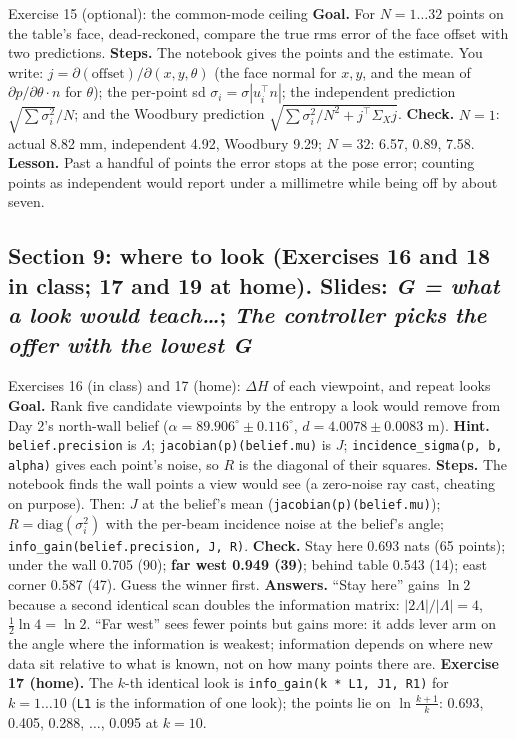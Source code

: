 \documentclass[11pt]{article}
\begin{document}
\begin{labhelp}{Exercise 15 (optional): the common-mode ceiling}
\textbf{Goal.} For $N=1\ldots32$ points on the table's face, dead-reckoned, compare the true rms error of the face offset with two predictions. \textbf{Steps.} The notebook gives the points and the estimate. You write: $j=\partial(\text{offset})/\partial(x,y,\theta)$ (the face normal for $x,y$, and the mean of $\partial p/\partial\theta\cdot n$ for $\theta$); the per-point sd $\sigma_i=\sigma|u_i^\top n|$; the independent prediction $\sqrt{\sum\sigma_i^2}/N$; and the Woodbury prediction $\sqrt{\sum\sigma_i^2/N^2+j^\top\Sigma_Xj}$. \textbf{Check.} $N=1$: actual 8.82 mm, independent 4.92, Woodbury 9.29; $N=32$: 6.57, 0.89, 7.58. \textbf{Lesson.} Past a handful of points the error stops at the pose error; counting points as independent would report under a millimetre while being off by about seven.
\end{labhelp}

\subsection*{Section 9: where to look (Exercises 16 and 18 in class; 17 and 19 at home). Slides: \emph{G = what a look would teach\ldots}; \emph{The controller picks the offer with the lowest G}}

\begin{labhelp}{Exercises 16 (in class) and 17 (home): $\Delta H$ of each viewpoint, and repeat looks}
\textbf{Goal.} Rank five candidate viewpoints by the entropy a look would remove from Day 2's north-wall belief ($\alpha=89.906^\circ\pm0.116^\circ$, $d=4.0078\pm0.0083$ m). \textbf{Hint.} \texttt{belief.precision} is $\Lambda$; \texttt{jacobian(p)(belief.mu)} is $J$; \texttt{incidence\_sigma(p, b, alpha)} gives each point's noise, so $R$ is the diagonal of their squares. \textbf{Steps.} The notebook finds the wall points a view would see (a zero-noise ray cast, cheating on purpose). Then: $J$ at the belief's mean (\texttt{jacobian(p)(belief.mu)}); $R=\mathrm{diag}(\sigma_i^2)$ with the per-beam incidence noise at the belief's angle; \texttt{info\_gain(belief.precision, J, R)}. \textbf{Check.} Stay here 0.693 nats (65 points); under the wall 0.705 (90); \textbf{far west 0.949 (39)}; behind table 0.543 (14); east corner 0.587 (47). Guess the winner first. \textbf{Answers.} ``Stay here'' gains $\ln2$ because a second identical scan doubles the information matrix: $|2\Lambda|/|\Lambda|=4$, $\tfrac12\ln4=\ln2$. ``Far west'' sees fewer points but gains more: it adds lever arm on the angle where the information is weakest; information depends on where new data sit relative to what is known, not on how many points there are. \textbf{Exercise 17 (home).} The $k$-th identical look is \texttt{info\_gain(k * L1, J1, R1)} for $k=1\ldots10$ (\texttt{L1} is the information of one look); the points lie on $\ln\frac{k+1}{k}$: 0.693, 0.405, 0.288, $\ldots$, 0.095 at $k=10$.
\end{labhelp}
\end{document}
